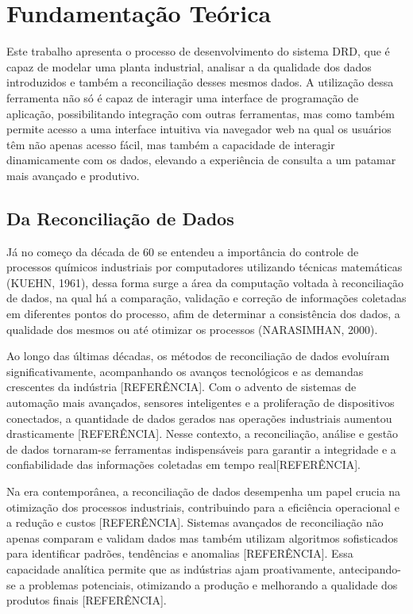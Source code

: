 \chapter[Fundamentação Teórica]{Fundamentação Teórica}

Este trabalho apresenta o processo de desenvolvimento do sistema DRD, que é capaz de modelar uma planta industrial, analisar a da qualidade dos dados introduzidos e também a reconciliação desses mesmos dados. A utilização dessa ferramenta não só é capaz de interagir uma interface de programação de aplicação, possibilitando integração com outras ferramentas, mas como também permite acesso a uma interface intuitiva via navegador web na qual os usuários têm não apenas acesso fácil, mas também a capacidade de interagir dinamicamente com os dados, elevando a experiência de consulta a um patamar mais avançado e produtivo. 


\section{Da Reconciliação de Dados}

Já no começo da década de 60 se entendeu a importância do controle de processos químicos industriais por computadores utilizando técnicas matemáticas (KUEHN, 1961), dessa forma surge a área da computação voltada à reconciliação de dados, na qual há a comparação, validação e correção de informações coletadas em diferentes pontos do processo, afim de determinar a consistência dos dados, a qualidade dos mesmos ou até otimizar os processos (NARASIMHAN, 2000).

Ao longo das últimas décadas, os métodos de reconciliação de dados evoluíram significativamente, acompanhando os avanços tecnológicos e as demandas crescentes da indústria [REFERÊNCIA]. Com o advento de sistemas de automação mais avançados, sensores inteligentes e a proliferação de dispositivos conectados, a quantidade de dados gerados nas operações industriais aumentou drasticamente [REFERÊNCIA]. Nesse contexto, a reconciliação, análise e gestão de dados tornaram-se ferramentas indispensáveis para garantir a integridade e a confiabilidade das informações coletadas em tempo real[REFERÊNCIA].

Na era contemporânea, a reconciliação de dados desempenha um papel crucia na otimização dos processos industriais, contribuindo para a eficiência operacional e a redução e custos [REFERÊNCIA]. Sistemas avançados de reconciliação não apenas comparam e validam dados mas também utilizam algoritmos sofisticados para identificar padrões, tendências e anomalias [REFERÊNCIA]. Essa capacidade analítica permite que as indústrias ajam proativamente, antecipando-se a problemas potenciais, otimizando a produção e melhorando a qualidade dos produtos finais [REFERÊNCIA].

